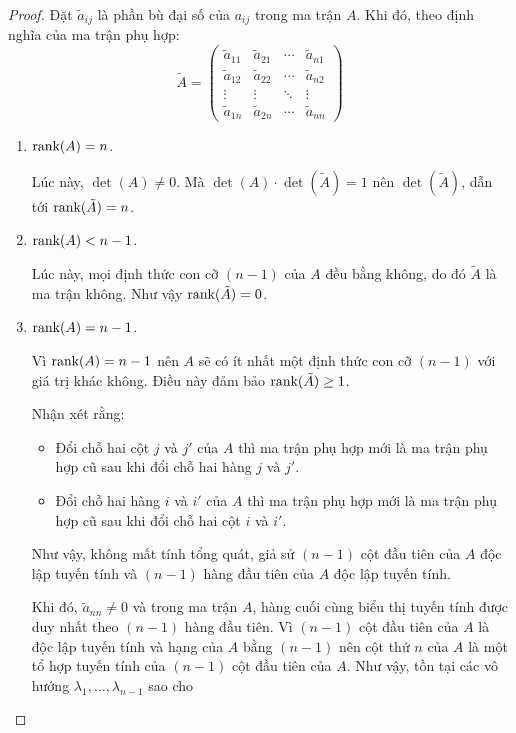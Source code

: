 \begin{proof}
    Đặt $\tilde{a}_{ij}$ là phần bù đại số của $a_{ij}$ trong ma trận $A$. Khi đó, theo định nghĩa của ma trận phụ hợp:
    \[
        \tilde{A} =
        \begin{pmatrix}
            \tilde{a}_{11} & \tilde{a}_{21} & \cdots & \tilde{a}_{n1} \\
            \tilde{a}_{12} & \tilde{a}_{22} & \cdots & \tilde{a}_{n2} \\
            \vdots         & \vdots         & \ddots & \vdots         \\
            \tilde{a}_{1n} & \tilde{a}_{2n} & \cdots & \tilde{a}_{nn}
        \end{pmatrix}
    \]
    \begin{enumerate}[label = \textbf{Trường hợp \arabic*.},itemindent=2cm]
        \item $\text{rank}(A) = n$.
              
              Lúc này, $\det(A)\ne 0$. Mà $\det(A)\cdot\det(\tilde{A}) = 1$ nên $\det(\tilde{A})$, dẫn tới $\text{rank}(\tilde{A}) = n$.
        \item $\text{rank}(A) < n - 1$.
              
              Lúc này, mọi định thức con cỡ $(n-1)$ của $A$ đều bằng không, do đó $\tilde{A}$ là ma trận không. Như vậy $\text{rank}(\tilde{A}) = 0$.
        \item $\text{rank}(A) = n - 1$.
              
              Vì $\text{rank}(A) = n - 1$ nên $A$ sẽ có ít nhất một định thức con cỡ $(n-1)$ với giá trị khác không. Điều này đảm bảo $\text{rank}(\tilde{A})\ge 1$.
              
              Nhận xét rằng:
              \begin{itemize}
                  \item Đổi chỗ hai cột $j$ và $j'$ của $A$ thì ma trận phụ hợp mới là ma trận phụ hợp cũ sau khi đổi chỗ hai hàng $j$ và $j'$.
                  \item Đổi chỗ hai hàng $i$ và $i'$ của $A$ thì ma trận phụ hợp mới là ma trận phụ hợp cũ sau khi đổi chỗ hai cột $i$ và $i'$.
              \end{itemize}
              
              Như vậy, không mất tính tổng quát, giả sử $(n-1)$ cột đầu tiên của $A$ độc lập tuyến tính và $(n-1)$ hàng đầu tiên của $A$ độc lập tuyến tính.
              
              Khi đó, $\tilde{a}_{nn}\ne 0$ và trong ma trận $A$, hàng cuối cùng biểu thị tuyến tính được duy nhất theo $(n-1)$ hàng đầu tiên.
              Vì $(n-1)$ cột đầu tiên của $A$ là độc lập tuyến tính và hạng của $A$ bằng $(n-1)$ nên cột thứ $n$ của $A$ là một tổ hợp tuyến tính của $(n-1)$ cột đầu tiên của $A$. Như vậy, tồn tại các vô hướng $\lambda_{1}, \ldots, \lambda_{n-1}$ sao cho


\end{enumerate}
\end{proof}

